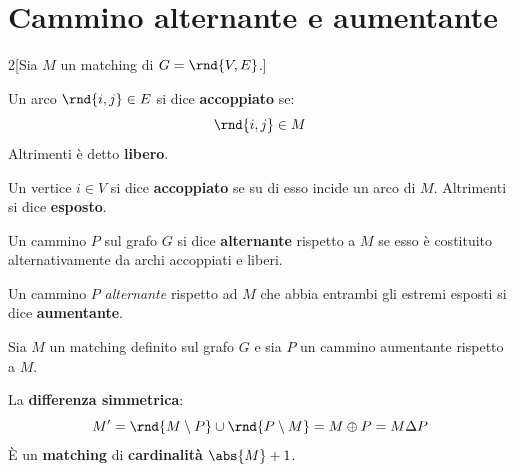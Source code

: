 \documentclass[\main/main.tex]{subfiles}
\begin{document}
\section{Cammino alternante e aumentante}
\begin{multicols}{2}[Sia \(M\) un matching di \(G = \rnd{V, E}\).]
	\begin{definition}
		Un arco \(\rnd{i,j} \in E\) si dice \textbf{accoppiato} se:
		\[
			\rnd{i,j} \in M
		\]
		Altrimenti è detto \textbf{libero}.
	\end{definition}
	\begin{definition}
		Un vertice \(i \in V\) si dice \textbf{accoppiato} se su di esso incide un arco di \(M\). Altrimenti si dice \textbf{esposto}.
	\end{definition}
	\begin{definition}
		Un cammino \(P\) sul grafo \(G\) si dice \textbf{alternante} rispetto a \(M\) se esso è costituito alternativamente da archi accoppiati e liberi.
	\end{definition}
	\begin{definition}
		Un cammino \(P\) \textit{alternante} rispetto ad \(M\) che abbia entrambi gli estremi esposti si dice \textbf{aumentante}.
	\end{definition}
\end{multicols}

\begin{theorem}
	Sia \(M\) un matching definito sul grafo \(G\) e sia \(P\) un cammino aumentante rispetto a \(M\).

	La \textbf{differenza simmetrica}:
	\[
		M' = \rnd{M\setminus P} \cup \rnd{P\setminus M} = M \oplus P = M \Delta P
	\]
	È un \textbf{matching} di \textbf{cardinalità} \(\abs{M} + 1\).
\end{theorem}
\end{document}
